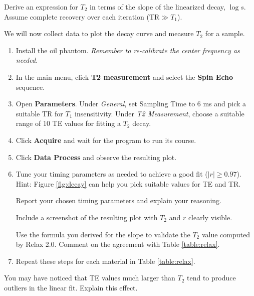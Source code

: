 \color{red}
Derive an expression for $T_2$ in terms of the slope of the linearized decay, $\log{s}$. Assume complete recovery over each iteration ($\text{TR} \gg T_1$).
\color{black}
\vspace{5mm}

We will now collect data to plot the decay curve and measure $T_2$ for a sample.

\begin{enumerate}
    \item   Install the oil phantom. \emph{Remember to re-calibrate the center frequency as needed}.
    \item   In the main menu, click \textbf{T2 measurement} and select the \textbf{Spin Echo} sequence.
    \item  Open \textbf{Parameters}. Under \emph{General}, set Sampling Time to 6 ms and pick a suitable TR for $T_1$ insensitivity. Under \emph{T2 Measurement}, choose a suitable range of 10 TE values for fitting a $T_2$ decay.
    \item   Click \textbf{Acquire} and wait for the program to run its course.
    \item   Click \textbf{Data Process} and observe the resulting plot.
    \item   Tune your timing parameters as needed to achieve a good fit ($|r| \geq 0.97$). Hint: Figure \ref{fig:decay} can help you pick suitable values for TE and TR.

    \color{red} Report your chosen timing parameters and explain your reasoning.
    \color{black}

    \color{red} 
    Include a screenshot of the resulting plot with $T_2$ and $r$ clearly visible. 
    \color{black}

    \color{red} 
    Use the formula you derived for the slope to validate the $T_2$ value computed by Relax 2.0. Comment on the agreement with Table \ref{table:relax}.
    \color{black} 
    
    \item   Repeat these steps for each material in Table \ref{table:relax}.
\end{enumerate}

\color{red}
You may have noticed that TE values much larger than $T_2$ tend to produce outliers in the linear fit. Explain this effect.
\color{black}

